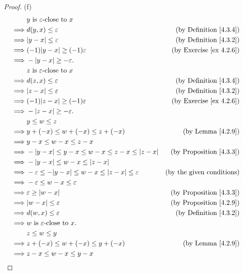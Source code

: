 \begin{proof}{(f)}
\begin{align*}
& y \text{ is } \varepsilon\text{-close to } x \\
\implies & d(y, x) \leq \varepsilon & \text{(by Definition \ref{4.3.4})} \\
\implies & |y - x| \leq \varepsilon & \text{(by Definition \ref{4.3.2})} \\
\implies & (-1)|y - x| \geq (-1)\varepsilon & \text{(by Exercise \ref{ex 4.2.6})} \\
\implies & -|y - x| \geq -\varepsilon. \\
& z \text{ is } \varepsilon\text{-close to } x \\
\implies & d(z, x) \leq \varepsilon & \text{(by Definition \ref{4.3.4})} \\
\implies & |z - x| \leq \varepsilon & \text{(by Definition \ref{4.3.2})} \\
\implies & (-1)|z - x| \geq (-1)\varepsilon & \text{(by Exercise \ref{ex 4.2.6})} \\
\implies & -|z - x| \geq -\varepsilon. \\
& y \leq w \leq z \\
\implies & y + (-x) \leq w + (-x) \leq z + (-x) & \text{(by Lemma \ref{4.2.9})} \\
\implies & y - x \leq w - x \leq z - x \\
\implies & -|y - x| \leq y - x \leq w - x \leq z - x \leq |z - x| & \text{(by Proposition \ref{4.3.3})} \\
\implies & -|y - x| \leq w - x \leq |z - x| \\
\implies & -\varepsilon \leq -|y - x| \leq w - x \leq |z - x| \leq \varepsilon & \text{(by the given conditions)} \\
\implies & -\varepsilon \leq w - x \leq \varepsilon \\
\implies & \varepsilon \geq |w - x| & \text{(by Proposition \ref{4.3.3})} \\
\implies & |w - x| \leq \varepsilon & \text{(by Proposition \ref{4.2.9})} \\
\implies & d(w, x) \leq \varepsilon & \text{(by Definition \ref{4.3.2})} \\
\implies & w \text{ is } \varepsilon\text{-close to } x. \\
& z \leq w \leq y \\
\implies & z + (-x) \leq w + (-x) \leq y + (-x) & \text{(by Lemma \ref{4.2.9})} \\
\implies & z - x \leq w - x \leq y - x \\

\end{align*}
\end{proof}
